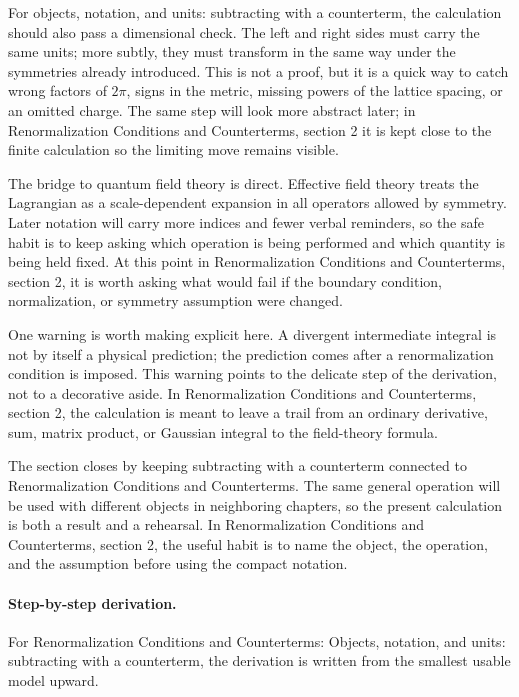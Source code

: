 For objects, notation, and units: subtracting with a counterterm, the calculation should also pass a dimensional check.  The left and right sides must carry the same units; more subtly, they must transform in the same way under the symmetries already introduced.  This is not a proof, but it is a quick way to catch wrong factors of \(2\pi\), signs in the metric, missing powers of the lattice spacing, or an omitted charge.  The same step will look more abstract later; in Renormalization Conditions and Counterterms, section 2 it is kept close to the finite calculation so the limiting move remains visible.

The bridge to quantum field theory is direct.  Effective field theory treats the Lagrangian as a scale-dependent expansion in all operators allowed by symmetry.  Later notation will carry more indices and fewer verbal reminders, so the safe habit is to keep asking which operation is being performed and which quantity is being held fixed.  At this point in Renormalization Conditions and Counterterms, section 2, it is worth asking what would fail if the boundary condition, normalization, or symmetry assumption were changed.

One warning is worth making explicit here.  A divergent intermediate integral is not by itself a physical prediction; the prediction comes after a renormalization condition is imposed.  This warning points to the delicate step of the derivation, not to a decorative aside.  In Renormalization Conditions and Counterterms, section 2, the calculation is meant to leave a trail from an ordinary derivative, sum, matrix product, or Gaussian integral to the field-theory formula.

The section closes by keeping subtracting with a counterterm connected to Renormalization Conditions and Counterterms.  The same general operation will be used with different objects in neighboring chapters, so the present calculation is both a result and a rehearsal.  In Renormalization Conditions and Counterterms, section 2, the useful habit is to name the object, the operation, and the assumption before using the compact notation.



\paragraph{Step-by-step derivation.}

For Renormalization Conditions and Counterterms: Objects, notation, and units: subtracting with a counterterm, the derivation is written from the smallest usable model upward.

